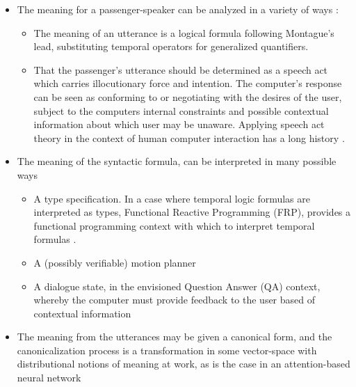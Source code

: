 \documentclass{article}
\begin{document}
\begin{itemize}
\item The meaning for a passenger-speaker can be analyzed in a variety of ways :
 \begin{itemize}
   \item The meaning of an utterance is a logical formula following Montague's
   lead, substituting temporal operators for generalized quantifiers.
   \item That the passenger's utterance should be determined as a speech act
     which carries illocutionary force and intention. The computer's
     response can be seen as conforming to or negotiating with the desires of
     the user, subject to the computers internal constraints and possible
     contextual information about which user may be unaware. Applying speech
     act theory in the context of human computer interaction has a long history
     \cite{winograd}.
 \end{itemize}
\item The meaning of the syntactic formula, can be interpreted in many possible ways
 \begin{itemize}
   \item A type specification. In a case where
     temporal logic formulas are interpreted as types, Functional Reactive
     Programming (FRP), provides a functional programming context with which to
     interpret temporal formulas
     \cite{hudak}.
   \item A (possibly verifiable) motion planner  \cite{verifiedMotion} \cite{7759412} \cite{kuo2020deep}
   \item A dialogue state, in the envisioned Question Answer (QA) context, whereby
     the computer must provide feedback to the user based of contextual information
 \end{itemize}
\item The meaning from the utterances may be given a canonical form,
 and the canonicalization process is a transformation in some vector-space with
 distributional notions of meaning at work, as is the case in an attention-based neural network
\end{itemize}
\end{document}
